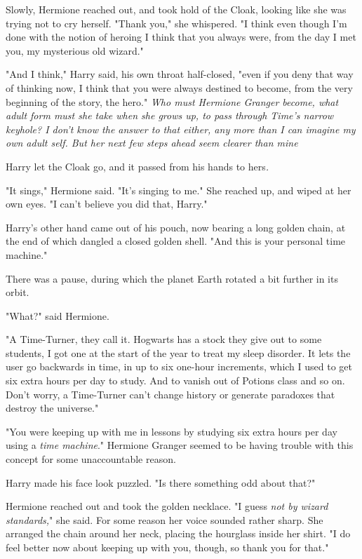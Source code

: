 Slowly, Hermione reached out, and took hold of the Cloak, looking like she was
trying not to cry herself. "Thank you," she whispered. "I think{\el} even
though I'm done with the notion of heroing{\el} I think that you always
were, from the day I met you, my mysterious old wizard."

"And I think," Harry said, his own throat half-closed, "even if you deny that
way of thinking now, I think that you were always destined to become, from the
very beginning of the story, the hero." \emph{Who must Hermione Granger become,
what adult form must she take when she grows up, to pass through Time's narrow
keyhole? I don't know the answer to that either, any more than I can imagine my
own adult self. But her next few steps ahead seem clearer than mine{\el}}

Harry let the Cloak go, and it passed from his hands to hers\emph{.}

"It sings," Hermione said. "It's singing to me." She reached up, and wiped at
her own eyes. "I can't believe you did that, Harry."

Harry's other hand came out of his pouch, now bearing a long golden chain, at
the end of which dangled a closed golden shell. "And this is your personal time
machine."

There was a pause, during which the planet Earth rotated a bit further in its
orbit.

"What?" said Hermione.

"A Time-Turner, they call it. Hogwarts has a stock they give out to some
students, I got one at the start of the year to treat my sleep disorder. It
lets the user go backwards in time, in up to six one-hour increments, which I
used to get six extra hours per day to study. And to vanish out of Potions
class and so on. Don't worry, a Time-Turner can't change history or generate
paradoxes that destroy the universe."

"You were keeping up with me in lessons by studying six extra hours per day
using a \emph{time machine}." Hermione Granger seemed to be having trouble with
this concept for some unaccountable reason.

Harry made his face look puzzled. "Is there something odd about that?"

Hermione reached out and took the golden necklace. "I guess \emph{not by wizard
standards,}" she said. For some reason her voice sounded rather sharp. She
arranged the chain around her neck, placing the hourglass inside her shirt. "I
do feel better now about keeping up with you, though, so thank you for that."

